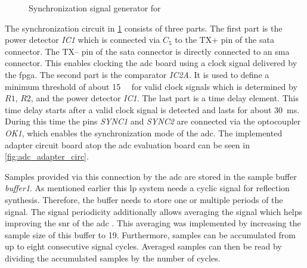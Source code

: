 \documentclass[12pt,a4paper,parskip=full,abstract=true,BCOR=12mm]{scrreprt}
\makeatletter
\newcommand\currentcoordinate{\the\tikz@lastxsaved,\the\tikz@lastysaved}
\def\device#1{\mbox{\textit{#1}}}
\makeatother
\begin{document}
\begin{figure}[htb]
{
    }
    \caption{Synchronization signal generator for }
    \label{fig:adc_adapter}
\end{figure}

The synchronization circuit in \cref{fig:adc_adapter} consists of three parts. The first part is the power detector \device{IC1}
which is connected via \device{$C_5$} to the TX+ pin of the \gls{sata} connector. The TX-- pin of the
\gls{sata} connector is directly connected to an \gls{sma} connector.
This enables clocking the \gls{adc} board using a clock signal delivered by the \gls{fpga}. The second part
is the comparator \device{IC2A}. It is used to define a minimum threshold of about \SI{15}{\milli\vrms}
for valid clock signals which is determined by \device{$R1$}, \device{$R2$}, and the power detector \device{IC1}. The last part is a time delay element. This time delay starts after a valid clock
signal is detected and lasts for about \SI{30}{\milli\second}. During
this time the pins \device{SYNC1} and \device{SYNC2} are connected via the optocoupler \device{OK1}, which
enables the synchronization mode of the \gls{adc}. The implemented adapter circuit board atop the
\gls{adc} evaluation board can be seen in \cref{fig:adc_adapter_circ}.

Samples provided via this connection by the \gls{adc} are stored in the sample buffer
\device{buffer1}. As mentioned earlier this \gls{lp} system needs a cyclic signal for
reflection synthesis. Therefore, the buffer needs to store one or multiple
periods of the signal. The signal periodicity additionally allows averaging the signal which helps
improving the \gls{snr} of the \gls{adc} \cite{ad_mt004}. This averaging was implemented by increasing
the sample size of this buffer to \SI{19}{\bit}. Furthermore, samples can be accumulated
from up to eight consecutive signal cycles. Averaged samples can then be read by dividing the
accumulated samples by the number of cycles.
\end{document}
